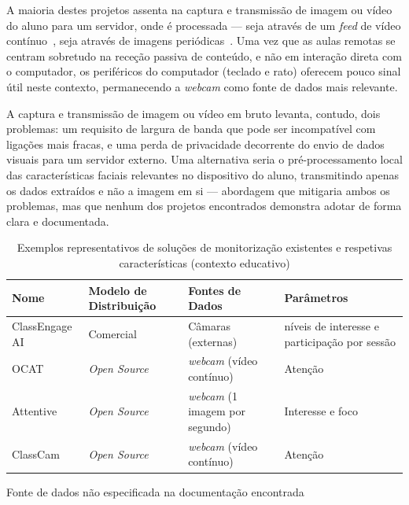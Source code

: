 A maioria destes projetos assenta na captura e transmissão de imagem ou vídeo do aluno para um servidor, onde é processada — seja através de um \textit{feed} de vídeo contínuo~\cite{classcam}, seja através de imagens periódicas~\cite{attentive}. Uma vez que as aulas remotas se centram sobretudo na receção passiva de conteúdo, e não em interação direta com o computador, os periféricos do computador (teclado e rato) oferecem pouco sinal útil neste contexto, permanecendo a \textit{webcam} como fonte de dados mais relevante.

A captura e transmissão de imagem ou vídeo em bruto levanta, contudo, dois problemas: um requisito de largura de banda que pode ser incompatível com ligações mais fracas, e uma perda de privacidade decorrente do envio de dados visuais para um servidor externo. Uma alternativa seria o pré-processamento local das características faciais relevantes no dispositivo do aluno, transmitindo apenas os dados extraídos e não a imagem em si — abordagem que mitigaria ambos os problemas, mas que nenhum dos projetos encontrados demonstra adotar de forma clara e documentada.

\begin{table}[h]
    \centering
    \begin{threeparttable}
        \caption{Exemplos representativos de soluções de monitorização existentes e respetivas características (contexto educativo)}
        \label{tab:alternatives_summary_school}
        \begin{tabularx}{\linewidth}{l l X X}
            \toprule
            \textbf{Nome} & \textbf{Modelo de Distribuição} & \textbf{Fontes de Dados} & \textbf{Parâmetros} \\
            \midrule
            ClassEngage AI & Comercial & Câmaras (externas) & níveis de interesse e participação por sessão \\
            \ac{OCAT} & \textit{Open Source} & \textit{webcam} (vídeo contínuo) & Atenção \\
            Attentive & \textit{Open Source} & \textit{webcam} (1 imagem por segundo) & Interesse e foco \\
            ClassCam & \textit{Open Source} & \textit{webcam} (vídeo contínuo) & Atenção \\ 
            \bottomrule
        \end{tabularx}
        \begin{tablenotes}
            \small
            \item[1] Fonte de dados não especificada na documentação encontrada
        \end{tablenotes}
    \end{threeparttable}
\end{table}




